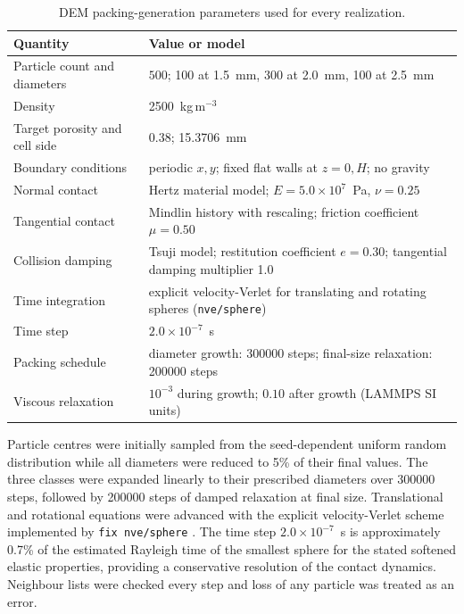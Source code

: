 \documentclass[12pt,a4paper]{article}
\begin{document}
	\begin{table}[!htbp]
		\centering
		\caption{DEM packing-generation parameters used for every realization.}
		\label{tab:demsettings}
		\small
		\begin{tabular}{P{5.6cm}P{6.3cm}}
			\toprule
			\textbf{Quantity} & \textbf{Value or model} \\
			\midrule
			Particle count and diameters & $500$; 100 at 1.5~mm, 300 at 2.0~mm, 100 at 2.5~mm \\
			Density & 2500~kg\,m$^{-3}$ \\
			Target porosity and cell side & 0.38; 15.3706~mm \\
			Boundary conditions & periodic $x,y$; fixed flat walls at $z=0,H$; no gravity \\
			Normal contact & Hertz material model; $E=5.0\times10^7$~Pa, $\nu=0.25$ \\
			Tangential contact & Mindlin history with rescaling; friction coefficient $\mu=0.50$ \\
			Collision damping & Tsuji model; restitution coefficient $e=0.30$; tangential damping multiplier 1.0 \\
			Time integration & explicit velocity-Verlet for translating and rotating spheres (\texttt{nve/sphere}) \\
			Time step & $2.0\times10^{-7}$~s \\
			Packing schedule & diameter growth: 300000 steps; final-size relaxation: 200000 steps \\
			Viscous relaxation & $10^{-3}$ during growth; $0.10$ after growth (LAMMPS SI units) \\
			\bottomrule
		\end{tabular}
	\end{table}
	
	Particle centres were initially sampled from the seed-dependent uniform random
	distribution while all diameters were reduced to 5\% of their final values. The
	three classes were expanded linearly to their prescribed diameters over 300000
	steps, followed by 200000 steps of damped relaxation at final size. Translational
	and rotational equations were advanced with the explicit velocity-Verlet scheme
	implemented by \texttt{fix nve/sphere} \cite{LAMMPSNVESphere}. The time step
	$2.0\times10^{-7}$~s is approximately 0.7\% of the estimated Rayleigh time of the
	smallest sphere for the stated softened elastic properties, providing a
	conservative resolution of the contact dynamics. Neighbour lists were checked
	every step and loss of any particle was treated as an error.
	
\end{document}
